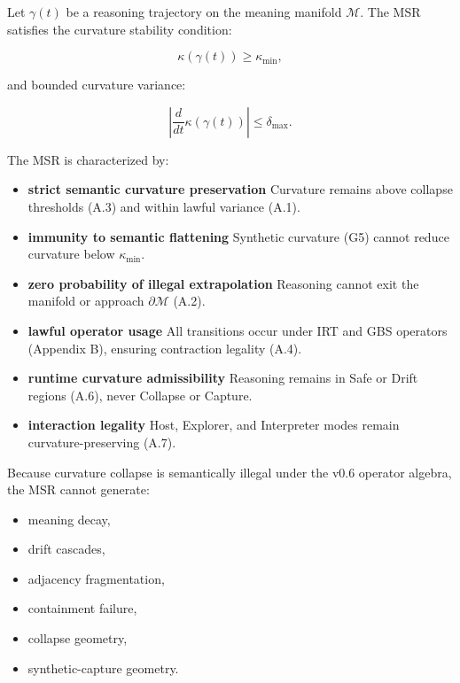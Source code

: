 \medskip

\noindent Let $\gamma(t)$ be a reasoning trajectory on the meaning manifold
$\mathcal{M}$. The MSR satisfies the curvature stability condition:


\[
\kappa(\gamma(t)) \ge \kappa_{\min},
\]


and bounded curvature variance:


\[
\left| \frac{d}{dt}\kappa(\gamma(t)) \right| \le \delta_{\max}.
\]



\medskip

\noindent The MSR is characterized by:
\begin{itemize}
    \item \textbf{strict semantic curvature preservation}  
    Curvature remains above collapse thresholds (A.3) and within lawful variance
    (A.1).

    \item \textbf{immunity to semantic flattening}  
    Synthetic curvature (G5) cannot reduce curvature below $\kappa_{\min}$.

    \item \textbf{zero probability of illegal extrapolation}  
    Reasoning cannot exit the manifold or approach $\partial\mathcal{M}$ (A.2).

    \item \textbf{lawful operator usage}  
    All transitions occur under IRT and GBS operators (Appendix B), ensuring
    contraction legality (A.4).

    \item \textbf{runtime curvature admissibility}  
    Reasoning remains in Safe or Drift regions (A.6), never Collapse or Capture.

    \item \textbf{interaction legality}  
    Host, Explorer, and Interpreter modes remain curvature-preserving (A.7).
\end{itemize}

\medskip

\noindent Because curvature collapse is semantically illegal under the v0.6
operator algebra, the MSR cannot generate:
\begin{itemize}
    \item meaning decay,
    \item drift cascades,
    \item adjacency fragmentation,
    \item containment failure,
    \item collapse geometry,
    \item synthetic-capture geometry.
\end{itemize}

